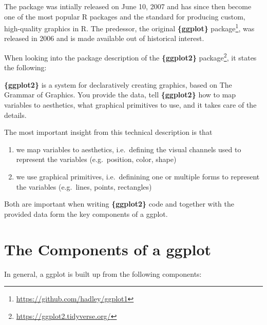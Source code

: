 \documentclass[
]{krantz}
\providecommand{\tightlist}{%
  \setlength{\itemsep}{0pt}\setlength{\parskip}{0pt}}
\renewenvironment{quote}{\begin{VF}}{\end{VF}}
\renewcommand{\href}[2]{#2\footnote{\url{#1}}}
\begin{document}
The package was intially released on June 10, 2007 and has since then become one of the most popular R packages and the standard for producing custom, high-quality graphics in R. The predessor, the original \href{https://github.com/hadley/ggplot1}{\textbf{\{ggplot\}} package}, was released in 2006 and is made available out of historical interest.

When looking into the package description of the \href{https://ggplot2.tidyverse.org/}{\textbf{\{ggplot2\}} package}, it states the following:

\begin{quote}
\textbf{\{ggplot2\}} is a system for declaratively creating graphics, based on The Grammar of Graphics. You provide the data, tell \textbf{\{ggplot2\}} how to map variables to aesthetics, what graphical primitives to use, and it takes care of the details.
\end{quote}

The most important insight from this technical description is that

\begin{enumerate}
\def\labelenumi{\arabic{enumi}.}
\tightlist
\item
  we map variables to aesthetics, i.e.~defining the visual channels used to represent the variables (e.g.~position, color, shape)
\item
  we use graphical primitives, i.e.~definining one or multiple forms to represent the variables (e.g.~lines, points, rectangles)
\end{enumerate}

Both are important when writing \textbf{\{ggplot2\}} code and together with the provided data form the key components of a ggplot.

\hypertarget{components}{%
\section{The Components of a ggplot}\label{components}}

In general, a ggplot is built up from the following components:
\end{document}
